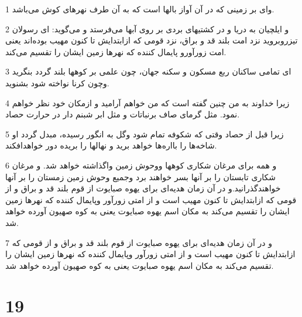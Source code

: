 \par 1 وای بر زمینی که در آن آواز بالها است که به آن طرف نهرهای کوش می‌باشد.
\par 2 و ایلچیان به دریا و در کشتیهای بردی بر روی آبها می‌فرستد و می‌گوید: ای رسولان تیزروبروید نزد امت بلند قد و براق، نزد قومی که ازابتدایش تا کنون مهیب بوده‌اند یعنی امت زورآورو پایمال کننده که نهرها زمین ایشان را تقسیم می‌کند.
\par 3 ‌ای تمامی ساکنان ربع مسکون و سکنه جهان، چون علمی بر کوهها بلند گردد بنگرید وچون کرنا نواخته شود بشنوید.
\par 4 زیرا خداوند به من چنین گفته است که من خواهم آرامید و ازمکان خود نظر خواهم نمود. مثل گرمای صاف برنباتات و مثل ابر شبنم دار در حرارت حصاد.
\par 5 زیرا قبل از حصاد وقتی که شکوفه تمام شود وگل به انگور رسیده، مبدل گردد او شاخه‌ها را بااره‌ها خواهد برید و نهالها را بریده دور خواهدافکند.
\par 6 و همه برای مرغان شکاری کوهها ووحوش زمین واگذاشته خواهد شد. و مرغان شکاری تابستان را بر آنها بسر خواهند برد وجمیع وحوش زمین زمستان را بر آنها خواهندگذرانید.و در آن زمان هدیه‌ای برای یهوه صبایوت از قوم بلند قد و براق و از قومی که ازابتدایش تا کنون مهیب است و از امتی زورآور وپایمال کننده که نهرها زمین ایشان را تقسیم می‌کند به مکان اسم یهوه صبایوت یعنی به کوه صهیون آورده خواهد شد.
\par 7 و در آن زمان هدیه‌ای برای یهوه صبایوت از قوم بلند قد و براق و از قومی که ازابتدایش تا کنون مهیب است و از امتی زورآور وپایمال کننده که نهرها زمین ایشان را تقسیم می‌کند به مکان اسم یهوه صبایوت یعنی به کوه صهیون آورده خواهد شد.
 
\chapter{19}

